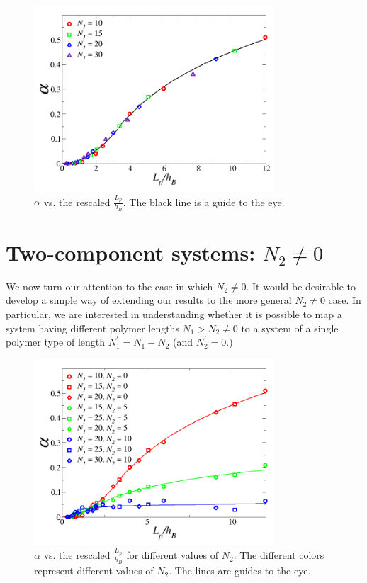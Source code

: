 \begin{figure}
	\begin{center}
	\includegraphics[width=0.8\textwidth]{brush/FvsLpscaled}
	\end{center}
	\caption[$\alpha$ vs. the rescaled $\frac{L_p}{h_B}$]{$\alpha$ vs. the rescaled $\frac{L_p}{h_B}$.  The black line is a guide to the eye.}\label{FvsLpscaled}
\end{figure}

\section{Two-component systems: $N_2 \neq 0$}

We now turn our attention to the case in which $N_2\neq 0$.
It would be desirable to develop a simple way of extending our results to the more 
general $N_2 \neq 0$ case. In particular, we are interested in understanding whether it is possible
to map a system having different polymer  lengths $N_1 > N_2 \neq 0$ to a system of a single polymer type of length $N_1^\prime = N_1-N_2$ (and $N_2^\prime = 0$.)

\begin{figure}
	\begin{center}
	\includegraphics[width=0.8\textwidth]{brush/FvsLpscaleddiff}
	\end{center}
	\caption[$\alpha$ vs. the rescaled $\frac{L_p}{h_B}$ for different values of $N_2$]{$\alpha$ vs. the rescaled $\frac{L_p}{h_B}$ for different values of $N_2$.  The different colors represent different values of $N_2$. The lines are guides to the eye.}\label{FvsLpscaleddiff}
\end{figure}


